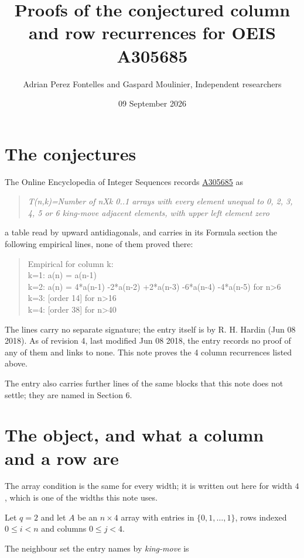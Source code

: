 \documentclass[11pt]{article}
\title{Proofs of the conjectured column and row recurrences for OEIS A305685}
\author{Adrian Perez Fontelles and Gaspard Moulinier, Independent researchers}
\date{09 September 2026}
\theoremstyle{definition}
\begin{document}
\maketitle
\section{The conjectures}

The Online Encyclopedia of Integer Sequences records \href{https://oeis.org/A305685}{A305685} as

\begin{quote}\itshape T(n,k)=Number of nXk 0..1 arrays with every element unequal to 0, 2, 3, 4, 5 or 6 king-move adjacent elements, with upper left element zero\end{quote}

a table read by upward antidiagonals, and carries in its Formula section the following empirical lines, none of them proved there:

\begin{quote}\ttfamily Empirical for column k:\\
k=1: a(n) = a(n-1)\\k=2: a(n) = 4*a(n-1) -2*a(n-2) +2*a(n-3) -6*a(n-4) -4*a(n-5) for n>6\\k=3: [order 14] for n>16\\k=4: [order 38] for n>40\end{quote}

The lines carry no separate signature; the entry itself is by R. H. Hardin (Jun 08 2018). As of revision 4, last modified Jun 08 2018, the entry records no proof of any of them and links to none. This note proves the 4 column recurrences listed above.

The entry also carries further lines of the same blocks that this note does not settle; they are named in Section 6.

\section{The object, and what a column and a row are}

The array condition is the same for every width; it is written out here for width $4$, which is one of the widths this note uses.

Let $q = 2$ and let $A$ be an $n \times 4$ array with entries in $\{0,1,\dots,1\}$, rows indexed $0 \le i < n$ and columns $0 \le j < 4$.

The neighbour set the entry names by {\itshape king-move} is
\end{document}
